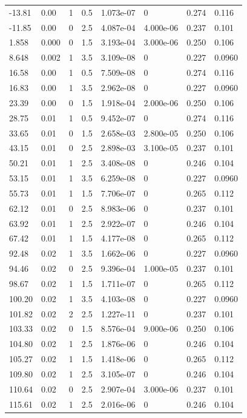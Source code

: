 \documentclass[preview]{standalone}
\begin{document}
{{\begin{tabular}{L{1.2cm}C{1.2cm} C{0.3cm}C{0.5cm} C{1.4cm}C{1.4cm} C{1.4cm}C{1.4cm}}
  -13.81  &  0.00  & 1     & 0.5 &  1.073e-07  & 0  & 0.274 &  0.116   \\ 
  -11.85  &  0.00  & 0     & 2.5 &  4.087e-04  & 4.000e-06  & 0.237 &  0.101   \\ 
  1.858  &  0.000  & 0     & 1.5 &  3.193e-04  & 3.000e-06  & 0.250 &  0.106   \\ 
  8.648  &  0.002  & 1     & 3.5 &  3.109e-08  & 0  & 0.227 &  0.0960   \\ 
  16.58  &  0.00  & 1     & 0.5 &  7.509e-08  & 0  & 0.274 &  0.116   \\ 
  16.83  &  0.00  & 1     & 3.5 &  2.962e-08  & 0  & 0.227 &  0.0960   \\ 
  23.39  &  0.00  & 0     & 1.5 &  1.918e-04  & 2.000e-06  & 0.250 &  0.106   \\ 
  28.75  &  0.01  & 1     & 0.5 &  9.452e-07  & 0  & 0.274 &  0.116   \\ 
  33.65  &  0.01  & 0     & 1.5 &  2.658e-03  & 2.800e-05  & 0.250 &  0.106   \\ 
  43.15  &  0.01  & 0     & 2.5 &  2.898e-03  & 3.100e-05  & 0.237 &  0.101   \\ 
  50.21  &  0.01  & 1     & 2.5 &  3.408e-08  & 0  & 0.246 &  0.104   \\ 
  53.15  &  0.01  & 1     & 3.5 &  6.259e-08  & 0  & 0.227 &  0.0960   \\ 
  55.73  &  0.01  & 1     & 1.5 &  7.706e-07  & 0  & 0.265 &  0.112   \\ 
  62.12  &  0.01  & 0     & 2.5 &  8.983e-06  & 0  & 0.237 &  0.101   \\ 
  63.92  &  0.01  & 1     & 2.5 &  2.922e-07  & 0  & 0.246 &  0.104   \\ 
  67.42  &  0.01  & 1     & 1.5 &  4.177e-08  & 0  & 0.265 &  0.112   \\ 
  92.48  &  0.02  & 1     & 3.5 &  1.662e-06  & 0  & 0.227 &  0.0960   \\ 
  94.46  &  0.02  & 0     & 2.5 &  9.396e-04  & 1.000e-05  & 0.237 &  0.101   \\ 
  98.67  &  0.02  & 1     & 1.5 &  1.711e-07  & 0  & 0.265 &  0.112   \\ 
  100.20  &  0.02  & 1     & 3.5 &  4.103e-08  & 0  & 0.227 &  0.0960   \\ 
  101.82  &  0.02  & 2     & 2.5 &  1.227e-11  & 0  & 0.237 &  0.101   \\ 
  103.33  &  0.02  & 0     & 1.5 &  8.576e-04  & 9.000e-06  & 0.250 &  0.106   \\ 
  104.80  &  0.02  & 1     & 2.5 &  1.876e-06  & 0  & 0.246 &  0.104   \\ 
  105.27  &  0.02  & 1     & 1.5 &  1.418e-06  & 0  & 0.265 &  0.112   \\ 
  109.80  &  0.02  & 1     & 2.5 &  3.105e-07  & 0  & 0.246 &  0.104   \\ 
  110.64  &  0.02  & 0     & 2.5 &  2.907e-04  & 3.000e-06  & 0.237 &  0.101   \\ 
  115.61  &  0.02  & 1     & 2.5 &  2.016e-06  & 0  & 0.246 &  0.104   \\ 
\hline 
\end{tabular} 

}}
\end{document}

